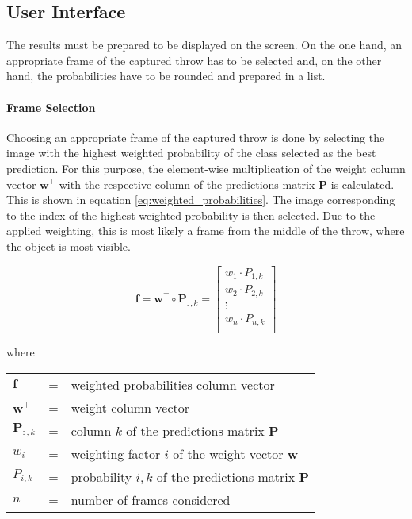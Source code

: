 \subsection{User Interface}
\label{subsec:inference:app:ui}

The results must be prepared to be displayed on the screen.
On the one hand, an appropriate frame of the captured throw has to be selected and, on the other hand, the probabilities have to be rounded and prepared in a list.

\paragraph{Frame Selection}
Choosing an appropriate frame of the captured throw is done by selecting the image with the highest weighted probability of the class selected as the best prediction.
For this purpose, the element-wise multiplication of the weight column vector $\boldsymbol{w}^\top$ with the respective column of the predictions matrix $\boldsymbol{P}$ is calculated.
This is shown in equation \ref{eq:weighted_probabilities}.
The image corresponding to the index of the highest weighted probability is then selected.
Due to the applied weighting, this is most likely a frame from the middle of the throw, where the object is most visible.

\begin{equation}
  \boldsymbol{f} = \boldsymbol{w}^\top \circ \boldsymbol{P}_{:,k} =
  \begin{bmatrix}
    w_{1} \cdot P_{1,k} \\
    w_{2} \cdot P_{2,k} \\
    \vdots \\
    w_{n} \cdot P_{n,k} \\
  \end{bmatrix}
  \label{eq:weighted_probabilities}
\end{equation}

where

\begin{tabular}{lll}
  $\boldsymbol{f}$ & = & weighted probabilities column vector \\
  $\boldsymbol{w}^\top$ & = & weight column vector \\
  $\boldsymbol{P}_{:,k}$ & = & column $k$ of the predictions matrix $\boldsymbol{P}$ \\
  $w_i$ & = & weighting factor $i$ of the weight vector $\boldsymbol{w}$ \\
  $P_{i,k}$ & = & probability $i,k$ of the predictions matrix $\boldsymbol{P}$ \\
  $n$ & = & number of frames considered \\
\end{tabular}
\\


